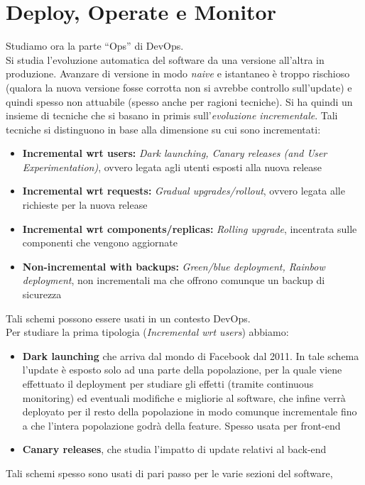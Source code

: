 \documentclass[a4paper,12pt, oneside]{book}
\begin{document}
\section{Deploy, Operate e Monitor}
Studiamo ora la parte ``Ops'' di DevOps.\\
Si studia l'evoluzione automatica del software da una versione all'altra in
produzione. Avanzare di versione in modo \textit{naive} e istantaneo è troppo
rischioso (qualora la nuova versione fosse corrotta non si avrebbe controllo
sull'update) e quindi spesso non attuabile (spesso anche per ragioni tecniche).
Si ha quindi un insieme di tecniche che si basano in primis
sull'\textit{evoluzione incrementale}. Tali tecniche si distinguono in base alla
dimensione su cui sono incrementati:
\begin{itemize}
  \item \textbf{Incremental wrt users:} \textit{Dark launching, Canary releases
    (and User Experimentation)}, ovvero legata agli utenti esposti alla nuova
  release
  \item \textbf{Incremental wrt requests:} \textit{Gradual upgrades/rollout},
  ovvero legata alle richieste per la nuova release
  \item \textbf{Incremental wrt components/replicas:} \textit{Rolling upgrade},
  incentrata sulle componenti che vengono aggiornate
  \item \textbf{Non-incremental with backups:} \textit{Green/blue deployment,
    Rainbow deployment}, non incrementali ma che offrono comunque un backup di
  sicurezza  
\end{itemize}
Tali schemi possono essere usati in un contesto DevOps.\\
Per studiare la prima tipologia (\textit{Incremental wrt users}) abbiamo:
\begin{itemize}
  \item \textbf{Dark launching} che arriva
  dal mondo di Facebook dal 2011. In tale schema 
  l'update è esposto solo ad una parte della popolazione, per la quale viene
  effettuato il deployment per studiare gli effetti (tramite continuous
  monitoring) ed eventuali modifiche e migliorie al software, che infine verrà
  deployato per il resto della popolazione in modo comunque incrementale fino a
  che l'intera popolazione godrà della feature. Spesso usata per front-end 
  \item \textbf{Canary releases}, che studia l'impatto di update relativi al
  back-end
\end{itemize}
Tali schemi spesso sono usati di pari passo per le varie sezioni del software,
\end{document}
